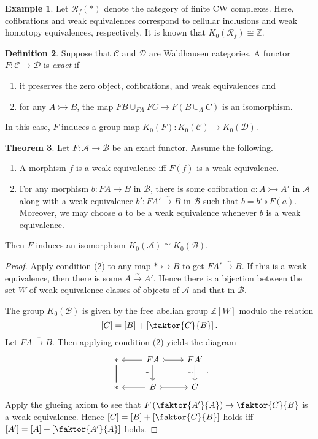 \documentclass[10pt,letterpaper,cm]{nupset}
\theoremstyle{definition}
\newtheorem{definition}{Definition}[section]
\newtheorem{exmp}[definition]{Example}
\theoremstyle{theorem}
\newtheorem{theorem}[definition]{Theorem}
\theoremstyle{remark}
\newcommand{\Z}{\mathbb Z}
\newcommand{\1}{\mathbf{1}}
\renewcommand{\a}{\mathscr{A}}
\renewcommand{\b}{\mathscr{B}}
\renewcommand{\c}{\mathscr{C}}
\renewcommand{\d}{\mathscr{D}}
\newcommand{\0}{\vec 0}
\begin{document}
\begin{exmp}
Let $\mathcal{R}_f(\ast)$ denote the category of finite CW complexes. Here, cofibrations and weak equivalences correspond to cellular inclusions  and weak homotopy equivalences, respectively. It is known that $K_0(\mathcal{R}_f) \cong \Z$.
\end{exmp}

\begin{definition}
Suppose that $\c$ and $\d$ are Waldhausen categories. A functor $F: \c \to \d$ is \textit{exact} if
\begin{enumerate}[label=(\alph*)] 
\item it preserves the zero object, cofibrations, and weak equivalences and 
\item for any $A \rightarrowtail B$, the map $FB \cup_{FA} FC \to F(B\cup_A C)$ is an isomorphism. 
\end{enumerate}
\end{definition}

In this case, $F$ induces a group map $K_0(F) :K_0(\c) \to K_0(\d)$.

\begin{theorem}
Let $F : \a \to \b$ be an exact functor. Assume the following.
\begin{enumerate}[label=(\arabic*)]
\item A morphism $f$ is a weak equivalence iff $F(f)$ is a weak equivalence.
\item For any morphism $b : FA \to B$ in $\b$, there is some cofibration $a: A \rightarrowtail A'$ in $\a$ along with a weak equivalence $b' : FA' \overset{\sim}{\longrightarrow} B$ in $\b$ such that $b = b' \circ F(a)$. Moreover, we may choose $a$ to be a weak equivalence whenever $b$ is a weak equivalence.
\end{enumerate}
Then $F$ induces an isomorphism $K_0(\a) \cong K_0(\b)$.
\end{theorem}
\begin{proof}
Apply condition (2) to any map $\ast \rightarrowtail B$ to get $FA' \overset{\sim}{\longrightarrow} B$. If this is a weak equivalence, then there is some $A \overset{\sim}{\longrightarrow} A'$. Hence there is a bijection between the set $W$ of weak-equivalence classes of objects of $\a$ and that in $\b$. 

 The group $K_0(\b)$ is given by the free abelian group $\Z[W]$ modulo the relation $$\left[C\right] = \left[B\right] + \left[\faktor{C}{B}\right].$$ Let $FA \overset{\sim}{\longrightarrow}  B$. Then applying condition (2) yields the diagram
\[
\begin{tikzcd}
\ast \arrow[d, no head] \arrow[d, no head] & FA \arrow[d, "\sim"'] \arrow[r, tail] \arrow[l] & FA' \arrow[d, "\sim"'] \\
\ast & B \arrow[r, tail] \arrow[l] & C
\end{tikzcd}.
\]
Apply the glueing axiom to see that $F\left(\faktor{A'}{A}\right) \to \faktor{C}{B}$ is a weak equivalence. Hence $\left[C\right] = \left[B\right] + \left[\faktor{C}{B}\right]$
 holds iff $\left[A'\right] = \left[A\right] + \left[\faktor{A'}{A}\right]$ holds.
\end{proof}
\end{document}
